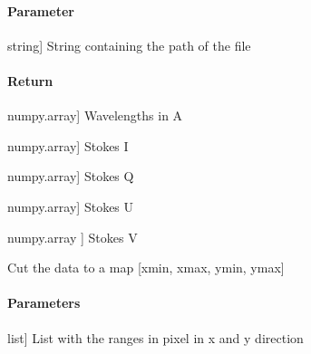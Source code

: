 \documentclass[letterpaper,10pt,english]{sphinxmanual}
\begin{document}
\begin{fulllineitems}
\begin{fulllineitems}
\paragraph{Parameter}
\label{\detokenize{classes:id35}}\begin{description}
\sphinxlineitem{filename}{[}string{]}
\sphinxAtStartPar
String containing the path of the file

\end{description}


\paragraph{Return}
\label{\detokenize{classes:id36}}\begin{description}
\sphinxlineitem{ll}{[}numpy.array{]}
\sphinxAtStartPar
Wavelengths in A

\sphinxlineitem{I}{[}numpy.array{]}
\sphinxAtStartPar
Stokes I

\sphinxlineitem{Q}{[}numpy.array{]}
\sphinxAtStartPar
Stokes Q

\sphinxlineitem{U}{[}numpy.array{]}
\sphinxAtStartPar
Stokes U

\sphinxlineitem{V}{[}numpy.array {]}
\sphinxAtStartPar
Stokes V

\end{description}

\end{fulllineitems}


\begin{fulllineitems}
\label{\detokenize{classes:profile_stk.Profile.cut_to_map}}
\pysigstartsignatures
{}
\pysigstopsignatures
\sphinxAtStartPar
Cut the data to a map {[}xmin, xmax, ymin, ymax{]}


\paragraph{Parameters}
\label{\detokenize{classes:id37}}\begin{description}
\sphinxlineitem{Map}{[}list{]}
\sphinxAtStartPar
List with the ranges in pixel in x and y direction

\end{description}

\end{fulllineitems}


\end{fulllineitems}
\end{document}
